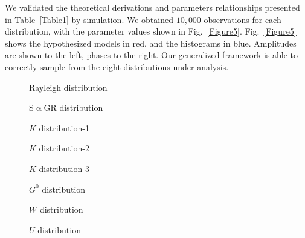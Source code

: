 \documentclass[journal]{IEEEtran}
\begin{document}
We validated the theoretical derivations and parameters relationships presented in Table~\ref{Table1} by simulation.
We obtained $10,000$ observations for each distribution, with the parameter values shown in Fig.~\ref{Figure5}.
Fig.~\ref{Figure5} shows
the hypothesized models in red, and
the histograms in blue.
Amplitudes are shown to the left, phases to the right.
Our generalized framework is able to correctly sample from the eight distributions under analysis.

\begin{figure*}[htb]
\centering
\begin{subfigure}[t]{4.2cm}
	\centering
	\caption{Rayleigh distribution}\label{Figure5(a)}
\end{subfigure}
\begin{subfigure}[t]{4.2cm}
	\centering
	\caption{S$\upalpha$GR distribution}\label{Figure5(b)}
\end{subfigure}
\begin{subfigure}[t]{4.2cm}
	\centering
	\caption{$K$ distribution-1}\label{Figure5(c)}
\end{subfigure}
\begin{subfigure}[t]{4.2cm}
	\centering
	\caption{$K$ distribution-2}\label{Figure5(d)}
\end{subfigure}
\begin{subfigure}[t]{4.2cm}
	\centering
	\caption{$K$ distribution-3}\label{Figure5(e)}
\end{subfigure}
\begin{subfigure}[t]{4.2cm}
	\centering
	\caption{$G^0$ distribution}\label{Figure5(f)}
\end{subfigure}
\begin{subfigure}[t]{4.2cm}
	\centering
	\caption{$W$ distribution}\label{Figure5(g)}
\end{subfigure}
\begin{subfigure}[t]{4.2cm}
	\centering
	\caption{$U$ distribution}\label{Figure5(h)}
\end{subfigure}
\begin{subfigure}[t]{4.2cm}
	\centering

\end{subfigure}
\end{figure*}
\end{document}
